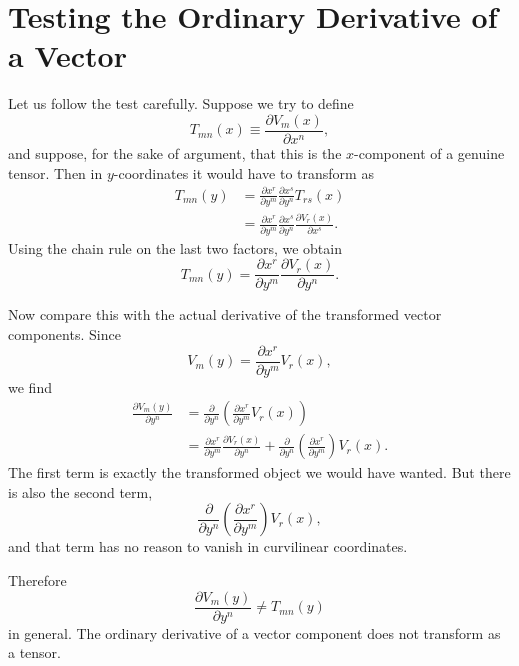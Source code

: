 \section{Testing the Ordinary Derivative of a Vector}

Let us follow the test carefully. Suppose we try to define
\begin{equation}
T_{mn}(x)\equiv \frac{\partial V_m(x)}{\partial x^n},
\end{equation}
and suppose, for the sake of argument, that this is the \(x\)-component of a genuine tensor. Then in \(y\)-coordinates it would have to transform as
\begin{align}
T_{mn}(y)
&=
\frac{\partial x^r}{\partial y^m}
\frac{\partial x^s}{\partial y^n}
T_{rs}(x) \\
&=
\frac{\partial x^r}{\partial y^m}
\frac{\partial x^s}{\partial y^n}
\frac{\partial V_r(x)}{\partial x^s}.
\end{align}
Using the chain rule on the last two factors, we obtain
\begin{equation}
T_{mn}(y)
=
\frac{\partial x^r}{\partial y^m}
\frac{\partial V_r(x)}{\partial y^n}.
\end{equation}

Now compare this with the actual derivative of the transformed vector components. Since
\begin{equation}
V_m(y)=\frac{\partial x^r}{\partial y^m}V_r(x),
\end{equation}
we find
\begin{align}
\frac{\partial V_m(y)}{\partial y^n}
&=
\frac{\partial}{\partial y^n}
\left(
\frac{\partial x^r}{\partial y^m}V_r(x)
\right) \\
&=
\frac{\partial x^r}{\partial y^m}\frac{\partial V_r(x)}{\partial y^n}
+
\frac{\partial}{\partial y^n}
\left(
\frac{\partial x^r}{\partial y^m}
\right)V_r(x).
\end{align}
The first term is exactly the transformed object we would have wanted. But there is also the second term,
\begin{equation}
\frac{\partial}{\partial y^n}
\left(
\frac{\partial x^r}{\partial y^m}
\right)V_r(x),
\end{equation}
and that term has no reason to vanish in curvilinear coordinates.

Therefore
\begin{equation}
\frac{\partial V_m(y)}{\partial y^n}\neq T_{mn}(y)
\end{equation}
in general. The ordinary derivative of a vector component does not transform as a tensor.

